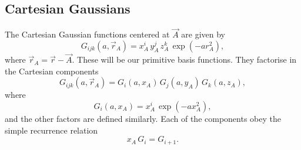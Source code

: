 \subsection{Cartesian Gaussians}
The Cartesian Gaussian functions centered at $\vec A$ are given by
\begin{equation}
 G_{ijk}(a, \vec r_A) = x^i_A\,y^j_A\,z^k_A\,\exp(-a r^2_A),
\end{equation}
where $\vec r_A = \vec r - \vec A$. These will be our primitive basis functions. They factorise in the Cartesian components
\begin{equation}
 G_{ijk}(a, \vec r_A) = G_i(a, x_A)\,G_j(a, y_A)\,G_k(a, z_A),
\end{equation}
where
\begin{equation}
 G_i(a, x_A) = x^i_A\,\exp(-a x^2_A),
\end{equation}
and the other factors are defined similarly. Each of the components obey the simple recurrence relation
\begin{equation}
 x_A\,G_i = G_{i+1}.
\end{equation}


